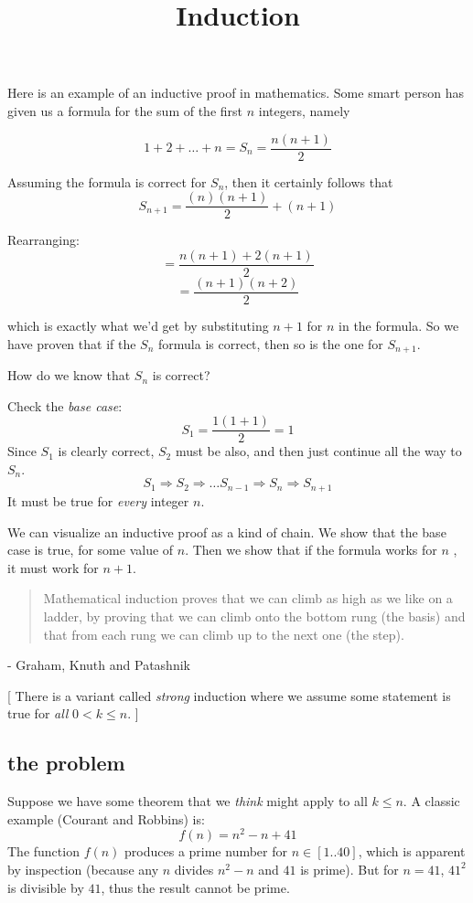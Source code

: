 \documentclass[11pt, oneside]{article}
\title{Induction}
\date{}
\begin{document}
\maketitle
\Large

\label{sec:Induction}

Here is an example of an inductive proof in mathematics.  Some smart person has given us a formula for the sum of the first $n$ integers, namely 

\[ 1 + 2 + \dots + n = S_n = \frac{n (n + 1)}{2} \]

Assuming the formula is correct for $S_n$, then it certainly follows that
\[ S_{n + 1} = \frac{(n)(n + 1)}{2} + (n+1) \]

Rearranging:
\[ = \frac{n(n + 1) + 2(n + 1)}{2} \]
\[ = \frac{(n + 1)(n + 2)}{2} \]

which is exactly what we'd get by substituting $n+1$ for $n$ in the formula.  So we have proven that if the $S_n$ formula is correct, then so is the one for $S_{n+1}$.

How do we know that $S_n$ is correct?

Check the \emph{base case}:
\[ S_1 = \frac{1(1 + 1)}{2} = 1 \]
Since $S_1$ is clearly correct, $S_2$ must be also, and then just continue all the way to $S_{n}$.
\[ S_1 \Rightarrow S_2 \Rightarrow \dots S_{n-1} \Rightarrow S_n \Rightarrow S_{n+1} \]
It must be true for \emph{every} integer $n$.

We can visualize an inductive proof as a kind of chain.  We show that the base case is true, for some value of $n$.  Then we show that if the formula works for $n$ , it must work for $n+1$.

\begin{quote}Mathematical induction proves that we can climb as high as we like on a ladder, by proving that we can climb onto the bottom rung (the basis) and that from each rung we can climb up to the next one (the step).\end{quote}

- Graham, Knuth and Patashnik

[ There is a variant called \emph{strong} induction where we assume some statement is true for \emph{all} $0 < k \le n$. ]

\subsection*{the problem}

Suppose we have some theorem that we \emph{think} might apply to all $k \le n$.  A classic example (Courant and Robbins) is:
\[ f(n) = n^2 - n + 41 \]
The function $f(n)$ produces a prime number for $n \in [1..40]$, which is apparent by inspection (because any $n$ divides $n^2 - n$ and $41$ is prime).  But for $n=41$, $41^2$ is divisible by $41$, thus the result cannot be prime.
\end{document}
